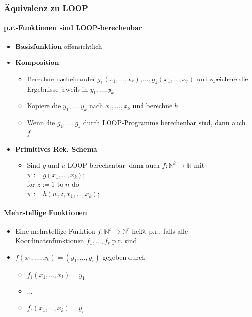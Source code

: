 \documentclass{scrartcl}
\begin{document}
\subsubsection{Äquivalenz zu LOOP}

\paragraph{p.r.-Funktionen sind LOOP-berechenbar}

\begin{itemize}
	\item \textbf{Basisfunktion} offensichtlich
	\item \textbf{Komposition}
	\begin{itemize}
		\item Berechne nacheinander $g_1(x_1,\ldots,x_r),\ldots,g_k(x_1,\ldots,x_r)$ und speichere die Ergebnisse jeweils in $y_1,\ldots,y_k$
		\item Kopiere die $y_1,\ldots,y_k$ nach $x_1,\ldots,x_k$ und berechne $h$
		\item Wenn die $g_1,\ldots,g_k$ durch LOOP-Programme berechenbar sind, dann auch $f$
	\end{itemize}
	\item \textbf{Primitives Rek. Schema}
	\begin{itemize}
		\item Sind $g$ und $h$ LOOP-berechenbar, dann auch $f: \mathbb{N}^k \rightarrow \mathbb{N}$ mit \\
		$w := g(x_1,\ldots,x_k);$ \\
		for $z := 1$ to $n$ do \\
		$w := h(w,z,x_1,\ldots,x_k);$
	\end{itemize}
\end{itemize}

\paragraph{Mehrstellige Funktionen}

\begin{itemize}
	\item Eine mehrstellige Funktion $f: \mathbb{N}^k \rightarrow \mathbb{N}^r$ heißt p.r., falls alle Koordinatenfunktionen $f_1,\ldots,f_r$ p.r. sind
	\item $f(x_1,\ldots,x_k) = (y_1,\ldots,y_r)$ gegeben durch
	\begin{itemize}
		\item $f_1(x_1,\ldots,x_k) = y_1$
		\item $\ldots$
		\item $f_r(x_1,\ldots,x_k) = y_r$
	\end{itemize}
\end{itemize}
\end{document}
